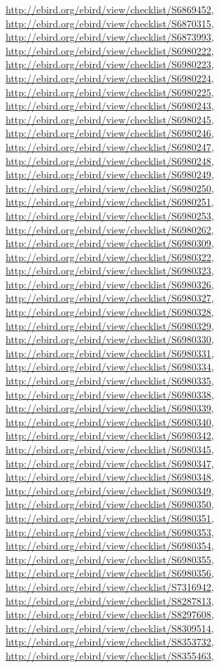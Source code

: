 \documentclass[9pt, article]{memoir}
\begin{document}
\begin{multicols}{2}
\url{http://ebird.org/ebird/view/checklist/S6869452}, 
\url{http://ebird.org/ebird/view/checklist/S6870315}, 
\url{http://ebird.org/ebird/view/checklist/S6873993}, 
\url{http://ebird.org/ebird/view/checklist/S6980222}, 
\url{http://ebird.org/ebird/view/checklist/S6980223}, 
\url{http://ebird.org/ebird/view/checklist/S6980224}, 
\url{http://ebird.org/ebird/view/checklist/S6980225}, 
\url{http://ebird.org/ebird/view/checklist/S6980243}, 
\url{http://ebird.org/ebird/view/checklist/S6980245}, 
\url{http://ebird.org/ebird/view/checklist/S6980246}, 
\url{http://ebird.org/ebird/view/checklist/S6980247}, 
\url{http://ebird.org/ebird/view/checklist/S6980248}, 
\url{http://ebird.org/ebird/view/checklist/S6980249}, 
\url{http://ebird.org/ebird/view/checklist/S6980250}, 
\url{http://ebird.org/ebird/view/checklist/S6980251}, 
\url{http://ebird.org/ebird/view/checklist/S6980253}, 
\url{http://ebird.org/ebird/view/checklist/S6980262}, 
\url{http://ebird.org/ebird/view/checklist/S6980309}, 
\url{http://ebird.org/ebird/view/checklist/S6980322}, 
\url{http://ebird.org/ebird/view/checklist/S6980323}, 
\url{http://ebird.org/ebird/view/checklist/S6980326}, 
\url{http://ebird.org/ebird/view/checklist/S6980327}, 
\url{http://ebird.org/ebird/view/checklist/S6980328}, 
\url{http://ebird.org/ebird/view/checklist/S6980329}, 
\url{http://ebird.org/ebird/view/checklist/S6980330}, 
\url{http://ebird.org/ebird/view/checklist/S6980331}, 
\url{http://ebird.org/ebird/view/checklist/S6980334}, 
\url{http://ebird.org/ebird/view/checklist/S6980335}, 
\url{http://ebird.org/ebird/view/checklist/S6980338}, 
\url{http://ebird.org/ebird/view/checklist/S6980339}, 
\url{http://ebird.org/ebird/view/checklist/S6980340}, 
\url{http://ebird.org/ebird/view/checklist/S6980342}, 
\url{http://ebird.org/ebird/view/checklist/S6980345}, 
\url{http://ebird.org/ebird/view/checklist/S6980347}, 
\url{http://ebird.org/ebird/view/checklist/S6980348}, 
\url{http://ebird.org/ebird/view/checklist/S6980349}, 
\url{http://ebird.org/ebird/view/checklist/S6980350}, 
\url{http://ebird.org/ebird/view/checklist/S6980351}, 
\url{http://ebird.org/ebird/view/checklist/S6980353}, 
\url{http://ebird.org/ebird/view/checklist/S6980354}, 
\url{http://ebird.org/ebird/view/checklist/S6980355}, 
\url{http://ebird.org/ebird/view/checklist/S6980356}, 
\url{http://ebird.org/ebird/view/checklist/S7316942}, 
\url{http://ebird.org/ebird/view/checklist/S8287813}, 
\url{http://ebird.org/ebird/view/checklist/S8297608}, 
\url{http://ebird.org/ebird/view/checklist/S8309514}, 
\url{http://ebird.org/ebird/view/checklist/S8353732}, 
\url{http://ebird.org/ebird/view/checklist/S8355463}, 

\end{multicols}
\end{document}
